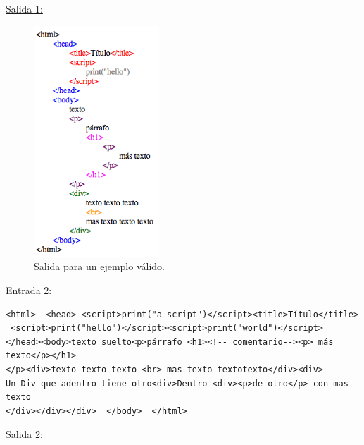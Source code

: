 \underline{Salida 1:}

\begin{figure}[h!]
\includegraphics[width=4.7cm]{img/ejemplo1.png}
      \caption{Salida para un ejemplo válido.}
      \label{salida1}
\end{figure}

\newpage

\underline{Entrada 2:}

\begin{verbatim}
<html>  <head> <script>print("a script")</script><title>Título</title>
 <script>print("hello")</script><script>print("world")</script>
</head><body>texto suelto<p>párrafo <h1><!-- comentario--><p> más texto</p></h1>
</p><div>texto texto texto <br> mas texto textotexto</div><div>
Un Div que adentro tiene otro<div>Dentro <div><p>de otro</p> con mas texto
</div></div></div>  </body>  </html>
\end{verbatim}

\underline{Salida 2:}

